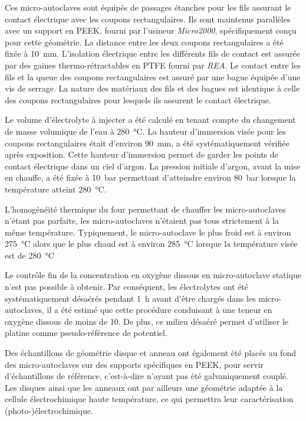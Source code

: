 \begin{refsection}
    
    Ces micro-autoclaves sont équipés de passages étanches pour les fils assurant le contact électrique avec
    les coupons rectangulaires. Ils sont maintenus parallèles avec un support en PEEK, fourni par l'usineur
    \emph{Micro2000}, spécifiquement
    conçu pour cette géométrie. La distance entre les deux coupons rectangulaires a été fixée à \SI{10}{\milli\meter}. L'isolation
    électrique entre les différents fils de contact est assurée par des gaines thermo-rétractables en PTFE fourni par
    \emph{REA}. Le contact
    entre les fils et la queue des coupons rectangulaires est assuré par une bague équipée d'une vis de serrage. La nature des
    matériaux des fils et des bagues est identique à celle des coupons rectangulaires pour lesquels ils assurent le contact électrique.
   
    Le volume d'électrolyte à injecter a été calculé en tenant compte du changement de masse volumique de l'eau à
    \SI{280}{\degreeCelsius}. La hauteur d'immersion visée pour les coupons rectangulaires
    était d'environ \SI{90}{\milli\meter}, a été systématiquement vérifiée après exposition. Cette hauteur
    d'immersion permet de garder les points de contact électrique dans un ciel d'argon. La pression initiale d'argon, avant la mise en
    chauffe, a été fixée à \SI{10}{\bar} permettant d'atteindre environ \SI{80}{\bar} lorsque la température atteint
    \SI{280}{\degreeCelsius}. 
    
    L'homogénéité thermique du four permettant de chauffer les micro-autoclaves n'étant pas
    parfaite, les micro-autoclaves n'étaient pas tous strictement à la même température. Typiquement, le
    micro-autoclave le plus froid est à environ \SI{275}{\degreeCelsius} alors que le plus chaud est à environ \SI{
    285}{\degreeCelsius} lorsque la température visée est de \SI{280}{\degreeCelsius}
       
    Le contrôle fin de la concentration en oxygène dissous en micro-autoclave statique n'est pas possible à obtenir.    
    Par conséquent, les électrolytes ont été systématiquement désaérés pendant \SI{1}{\hour} avant d'être chargés 
    dans les micro-autoclaves, il a été estimé que cette procédure conduisant à une teneur en oxygène dissous de
    moins de \SI{10}{\ppb}. De plus, ce milieu
    désaéré permet d'utiliser le platine comme pseudo-référence de potentiel.

    Des échantillons de géométrie disque et anneau ont également été placés au fond des micro-autoclaves sur des supports
    spécifiques en PEEK, 
    pour servir d'échantillons de référence, c'est-à-dire n'ayant pas été galvaniquement couplé. 
    Les disques ainsi que les anneaux ont par ailleurs une géométrie adaptée à la cellule électrochimique haute
    température, ce qui permettra leur caractérisation (photo-)électrochimique.
    

\end{refsection}

